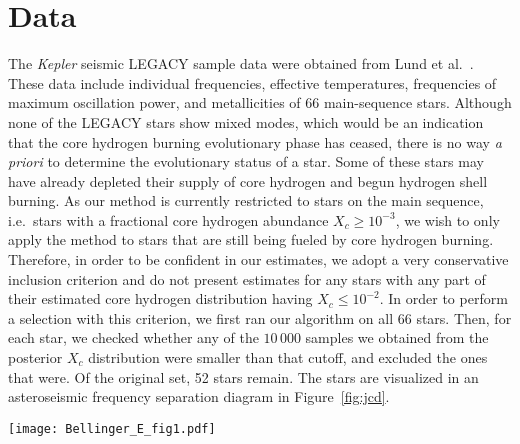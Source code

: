 \documentclass[epj,twocolumn]{webofc}
\begin{document}
\section{Data} \label{data}
%
The \emph{Kepler} seismic LEGACY sample data were obtained from Lund et al.~\cite{Lund}. These data include individual frequencies, effective temperatures, frequencies of maximum oscillation power, and metallicities of 66 main-sequence stars.
Although none of the LEGACY stars show mixed modes, which would be an indication that the core hydrogen burning evolutionary phase has ceased, there is no way \emph{a priori} to determine the evolutionary status of a star. Some of these stars may have already depleted their supply of core hydrogen and begun hydrogen shell burning. 
As our method is currently restricted to stars on the main sequence, i.e.~stars with a fractional core hydrogen abundance $X_c \geq 10^{-3}$, we wish to only apply the method to stars that are still being fueled by core hydrogen burning. 
Therefore, in order to be confident in our estimates, we adopt a very conservative inclusion criterion and do not present estimates for any stars with any part of their estimated core hydrogen distribution having $X_c \leq 10^{-2}$. 
In order to perform a selection with this criterion, we first ran our algorithm on all 66 stars. Then, for each star, we checked whether any of the $10\,000$ samples we obtained from the posterior $X_c$ distribution were smaller than that cutoff, and excluded the ones that were. 
Of the original set, 52 stars remain. The stars are visualized in an asteroseismic frequency separation diagram in Figure~\ref{fig:jcd}. 
%
\begin{figure*}
    \centering
    \texttt{[image: Bellinger\_E\_fig1.pdf]}
    \caption{Small frequency separations against large frequency separations with [Fe/H] indicated by color for 52 main-sequence \emph{Kepler} LEGACY stars overplotted on top of evolutionary models varied in mass with solar-calibrated mixing length and abundances generated using MESA \cite{MESA} with frequencies calculated using GYRE \cite{GYRE}. If all stars had the solar abundances and solar mixing length, it would suffice to look up their mass and core-hydrogen abundance in this diagram. Since they do not, a more sophisticated approach is required; here we employ the method introduced in Paper 1 for this task.}
    \label{fig:jcd}
\end{figure*}
%
%
\end{document}

